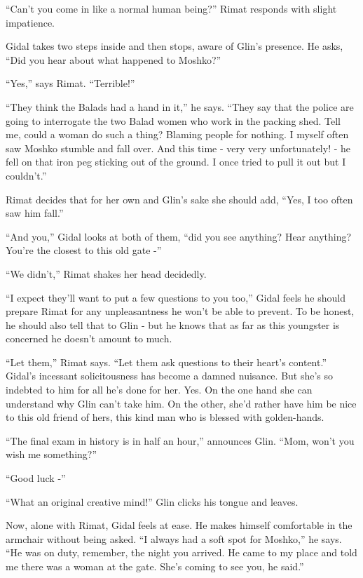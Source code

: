 \documentclass[twoside,11pt]{book}
\begin{document}
``Can't you come in like a normal human being?'' Rimat responds with slight
impatience. \

Gidal takes two steps inside and then stops, aware of Glin's presence. He asks, ``Did you hear about what
happened to Moshko?''

``Yes,'' says Rimat. ``Terrible!''

``They think the Balads had a hand in it,'' he says. ``They say that the police
are going to interrogate the two Balad women who work in the packing shed. Tell me, could a woman do such a thing?
Blaming people for nothing. I myself often saw Moshko stumble and fall over. And this time - very very unfortunately! -
he fell on that iron peg sticking out of the ground. I once tried to pull it out but I couldn't.''

Rimat decides that for her own and Glin's sake she should add, ``Yes, I too often saw him
fall.''

``And you,'' Gidal looks at both of them, ``did you see anything? Hear anything?
You're the closest to this old gate -''

``We didn't,'' Rimat shakes her head decidedly.

``I expect they'll want to put a few questions to you too,'' Gidal feels he should prepare
Rimat for any unpleasantness he won't be able to prevent. To be honest, he should also tell that to Glin - but he
knows that as far as this youngster is concerned he doesn't amount to much.

``Let them,'' Rimat says. ``Let them ask questions to their heart's
content.'' Gidal's incessant solicitousness has become a damned nuisance. But she's so indebted to him for
all he's done for her. Yes. On the one hand she can understand why Glin can't take him. On the other, she'd rather have
him be nice to this old friend of hers, this kind man who is blessed with golden-hands.

``The final exam in history is in half an hour,'' announces Glin. ``Mom, won't
you wish me something?''

``Good luck -''

``What an original creative mind!'' Glin clicks his tongue and leaves.

Now, alone with Rimat, Gidal feels at ease. He makes himself comfortable in the armchair without being asked.
``I always had a soft spot for Moshko,'' he says. ``He was on duty, remember,
the night you arrived. He came to my place and told me there was a woman at the gate. She's coming to see you, he
said.''
\end{document}

